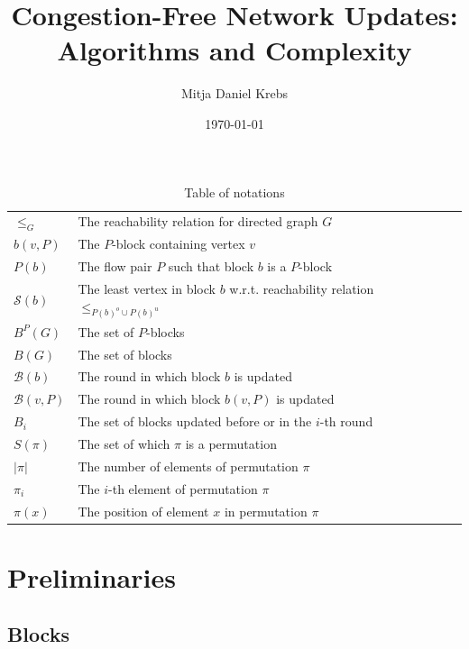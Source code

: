 \documentclass[fontsize=11pt,paper=a4]{book}
\author{Mitja Daniel Krebs}
\date{\today}
\title{Congestion-Free Network Updates: Algorithms and Complexity}
\begin{document}
\maketitle
\tableofcontents

\begin{table}[htbp]
\caption{Table of notations}
\centering
\begin{tabular}{ll}
\hyperref[orgc40fbed]{\(\leq_G\)} & The reachability relation for directed graph \(G\)\\[0pt]
\hyperref[org6c1d07b]{\(b(v,P)\)} & The \(P\)-block containing vertex \(v\)\\[0pt]
\hyperref[org48541ca]{\(P(b)\)} & The flow pair \(P\) such that block \(b\) is a \(P\)-block\\[0pt]
\hyperref[orgd3dd3c7]{\(\mathcal{S}(b)\)} & The least vertex in block \(b\) w.r.t. reachability relation \(\leq_{P(b)^o\cup P(b)^u}\)\\[0pt]
\hyperref[orgd08d3dd]{\(B^P(G)\)} & The set of \(P\)-blocks\\[0pt]
\hyperref[org8ecbe6a]{\(B(G)\)} & The set of blocks\\[0pt]
\hyperref[org78c9a03]{\(\mathcal{B}(b)\)} & The round in which block \(b\) is updated\\[0pt]
\hyperref[orgefe9042]{\(\mathcal{B}(v,P)\)} & The round in which block \(b(v,P)\) is updated\\[0pt]
\hyperref[org7110eb0]{\(B_i\)} & The set of blocks updated before or in the \(i\)-th round\\[0pt]
\hyperref[orga3cd559]{\(S(\pi)\)} & The set of which \(\pi\) is a permutation\\[0pt]
\hyperref[orga3cd559]{\(\lvert\pi\rvert\)} & The number of elements of permutation \(\pi\)\\[0pt]
\hyperref[orga3cd559]{\(\pi_i\)} & The \(i\)-th element of permutation \(\pi\)\\[0pt]
\hyperref[orga3cd559]{\(\pi(x)\)} & The position of element \(x\) in permutation \(\pi\)\\[0pt]
\end{tabular}
\end{table}

\part{Preliminaries}
\label{sec:org36b665d}

\chapter{Blocks}
\label{sec:org97e3d2d}
\end{document}
